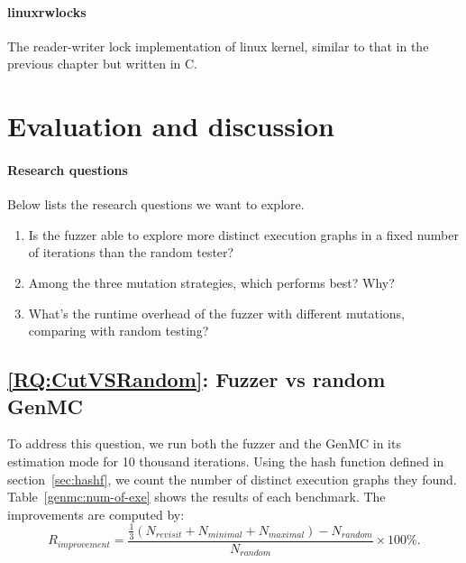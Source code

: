 \paragraph{linuxrwlocks} The reader-writer lock implementation of linux kernel, similar to that in the previous chapter but written in C. 

\section{Evaluation and discussion}

\paragraph*{Research questions} Below lists the research questions we want to explore.

\begin{enumerate}[label=RQ\arabic*,resume]
	\item Is the fuzzer able to explore more distinct execution graphs in a fixed number of iterations than the random tester? \label{RQ:CutVSRandom}
	\item Among the three mutation strategies, which performs best? Why? \label{RQ:CutComparison}
	\item What's the runtime overhead of the fuzzer with different mutations, comparing with random testing? \label{RQ:GenMCOverhead}
\end{enumerate}

\subsection{\ref*{RQ:CutVSRandom}: Fuzzer vs random GenMC }

To address this question, we run both the fuzzer and the GenMC in its estimation mode for 10 thousand iterations. Using the hash function defined in section~\ref{sec:hashf}, we count the number of distinct execution graphs they found. Table~\ref{genmc:num-of-exe} shows the results of each benchmark. The improvements are computed by:
\[
	R_{improvement} = \frac{\frac{1}{3} (N_{revisit}+N_{minimal}+N_{maximal}) - N_{random} }{N_{random}} \times 100 \%.
\]

